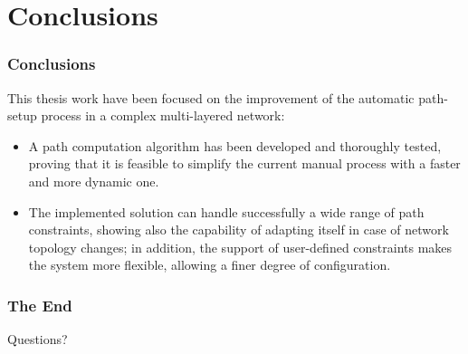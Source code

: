 \documentclass{beamer}
\begin{document}
\section{Conclusions}
\frame
{
  \frametitle{Conclusions}

  This thesis work have been focused on the improvement of the
  automatic path-setup process in a complex multi-layered network:

  \begin{itemize}
  \item<1-> A path computation algorithm has been developed and thoroughly tested,
    proving that it is feasible to simplify the current manual process
    with a faster and more dynamic one. 
  \item<2-> The implemented solution can handle successfully a wide
    range of path constraints, showing also the capability of adapting
    itself in case of network topology changes; in addition, the support
    of user-defined constraints makes the system more flexible, allowing
    a finer degree of configuration.
  \end{itemize}
}
\frame
{
  \frametitle{The End}

  \begin{center}
  Questions?
  \end{center}
}
\end{document}
